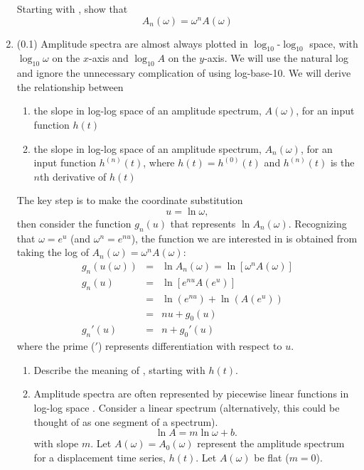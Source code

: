 \documentclass[11pt,titlepage,fleqn]{article}
\newcommand{\fft}{h}
\begin{document}
\begin{enumerate}
Starting with , show that
%
\begin{equation}
A_n(\omega) = \omega^n A(\omega)
\end{equation}


\item (0.1) Amplitude spectra are almost always plotted in $\log_{10}$-$\log_{10}$ space, with $\log_{10}\omega$ on the $x$-axis and $\log_{10}A$ on the $y$-axis. We will use the natural log and ignore the unnecessary complication of using log-base-10. We will derive the relationship between
%
\begin{enumerate}
\item the slope in log-log space of an amplitude spectrum, $A(\omega)$, for an input function $\fft(t)$
\item the slope in log-log space of an amplitude spectrum, $A_n(\omega)$, for an input function $h^{(n)}(t)$, where $h(t) = h^{(0)}(t)$ and $h^{(n)}(t)$ is the $n$th derivative of $h(t)$
\end{enumerate}

The key step is to make the coordinate substitution
%
\begin{equation}
u = \ln\omega,
\end{equation}
%
then consider the function $g_n(u)$ that represents $\ln A_n(\omega)$. Recognizing that $\omega = e^u$ (and $\omega^n = e^{nu}$), the function we are interested in is obtained from taking the log of \mbox{$A_n(\omega) = \omega^n A(\omega)$}:
%
\begin{eqnarray}
g_n(u(\omega)) &=& \ln A_n(\omega) = \ln[ \omega^n A(\omega)]
\\
g_n(u) &=& \ln[ e^{nu} A(e^u) ]
\\
&=& \ln(e^{nu}) + \ln(A(e^u))
\\
&=& nu + g_0(u)
\\
g_n'(u) &=& n + g_0'(u)
\label{Anslope}
\end{eqnarray}
%
where the prime ($'$) represents differentiation with respect to $u$.

\begin{enumerate}
\item Describe the meaning of , starting with $\fft(t)$.

\item Amplitude spectra are often represented by piecewise linear functions in log-log space \citep[\eg][Figs.~6.3-6 and 6.6-8]{SteinWysession}. Consider a linear spectrum (alternatively, this could be thought of as one segment of a spectrum).
%
\begin{equation}
\ln A = m \ln\omega + b.
\label{Alin}
\end{equation}
%
with slope $m$.
Let $A(\omega) = A_0(\omega)$ represent the amplitude spectrum for a displacement time series, $\fft(t)$. Let $A(\omega)$ be flat ($m=0$).


\end{enumerate}
\end{enumerate}
\end{document}
